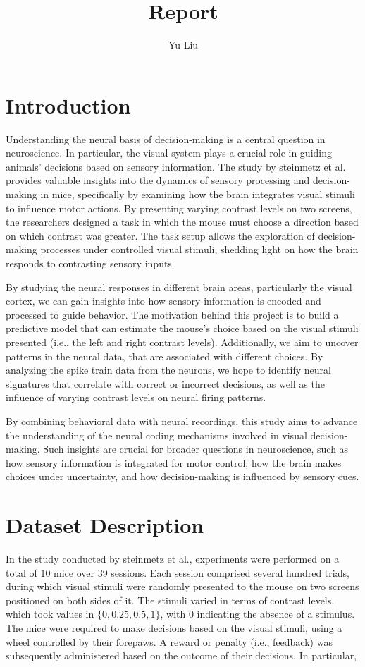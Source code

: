 \documentclass[12pt]{article}
\title{Report}
\author{Yu Liu}
\date{}
\begin{document}
\maketitle

\section{Introduction}
Understanding the neural basis of decision-making is a central question in neuroscience. In particular, the visual system plays a crucial role in guiding animals' decisions based on sensory information. The study by steinmetz et al. provides valuable insights into the dynamics of sensory processing and decision-making in mice, specifically by examining how the brain integrates visual stimuli to influence motor actions. By presenting varying contrast levels on two screens, the researchers designed a task in which the mouse must choose a direction based on which contrast was greater. The task setup allows the exploration of decision-making processes under controlled visual stimuli, shedding light on how the brain responds to contrasting sensory inputs.

By studying the neural responses in different brain areas, particularly the visual cortex, we can gain insights into how sensory information is encoded and processed to guide behavior. The motivation behind this project is to build a predictive model that can estimate the mouse's choice based on the visual stimuli presented (i.e., the left and right contrast levels). Additionally, we aim to uncover patterns in the neural data, that are associated with different choices. By analyzing the spike train data from the neurons, we hope to identify neural signatures that correlate with correct or incorrect decisions, as well as the influence of varying contrast levels on neural firing patterns.

By combining behavioral data with neural recordings, this study aims to advance the understanding of the neural coding mechanisms involved in visual decision-making. Such insights are crucial for broader questions in neuroscience, such as how sensory information is integrated for motor control, how the brain makes choices under uncertainty, and how decision-making is influenced by sensory cues.

\section{Dataset Description}
In the study conducted by steinmetz et al., experiments were performed on a total of 10 mice over 39 sessions. Each session comprised several hundred trials, during which visual stimuli were randomly presented to the mouse on two screens positioned on both sides of it. The stimuli varied in terms of contrast levels, which took values in $\{0, 0.25, 0.5, 1\}$, with $0$ indicating the absence of a stimulus. The mice were required to make decisions based on the visual stimuli, using a wheel controlled by their forepaws. A reward or penalty (i.e., feedback) was subsequently administered based on the outcome of their decisions. In particular,
\end{document}
